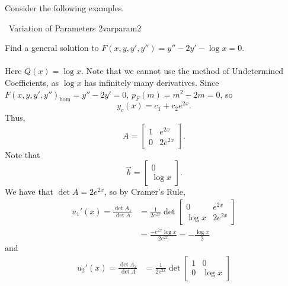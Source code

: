         Consider the following examples.
        \begin{example}{\Difficulty\,\Difficulty\,\,Variation of Parameters 2}{varparam2}
            
            Find a general solution to \(F(x,y,y',y'')=y''-2y'-\log x=0\).
            \\
            \\
            Here \(Q(x)=\log x\). Note that we cannot use the method of Undetermined Coefficients, as \(\log x\) has infinitely many derivatives. Since \(F(x,y,y',y'')_\text{hom}=y''-2y'=0\), \(p_F(m)=m^2-2m=0\), so
            \begin{equation*}
                y_c(x)=c_1+c_2e^{2x}.
            \end{equation*}
            Thus,
            \begin{equation*}
                A=\begin{bmatrix}
                    1 & e^{2x} \\
                    0 & 2e^{2x}
                \end{bmatrix}.
            \end{equation*}
            Note that
            \begin{equation*}
                \vec{b}=\begin{bmatrix}
                    0 \\
                    \log x
                \end{bmatrix}.
            \end{equation*}
            We have that \(\det A=2e^{2x}\), so by Cramer's Rule,
            \begin{align*}
                u_1'(x)=\frac{\det A_1}{\det A}&=\frac{1}{2e^{2x}}\det \begin{bmatrix}
                    0 & e^{2x} \\
                    \log x & 2e^{2x}
                \end{bmatrix} \\
                &=\frac{-e^{2x}\log x}{2e^{2x}}=-\frac{\log x}{2}
            \end{align*}
            and
            \begin{align*}
                u_2'(x)=\frac{\det A_2}{\det A}&=\frac{1}{2e^{2x}}\det \begin{bmatrix}
                    1 & 0 \\
                    0 & \log x
                \end{bmatrix} \\

\end{align*}
\end{example}
